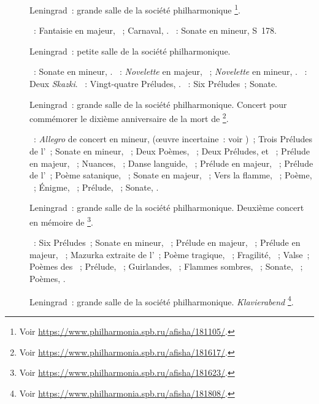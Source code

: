 \begin{description}
 \item[]
 Leningrad~: grande salle de la société philharmonique%
 \footnote{Voir \href{https://www.philharmonia.spb.ru/afisha/181105/}%
 {https://www.philharmonia.spb.ru/afisha/181105/}.}.

 \textsc{\Schumann{}}~: Fantaisie en \kC majeur, ~; Carnaval,
 .
 \textsc{\Liszt{}}~: Sonate en \kB mineur, S~178.
 \item[]
 Leningrad~: petite salle de la société philharmonique.

 \textsc{\Beethoven{}}~: Sonate en \kC \Sharp mineur,  .
 \textsc{\Schumann{}}~: \emph{Novelette} en \kE majeur, 
 ~; \emph{Novelette} en \kF \Sharp mineur,  .
 \textsc{\Medtner{}}~: Deux \emph{Skazki}.
 \textsc{\Chopin{}}~: Vingt-quatre Préludes, .
 \textsc{\Scriabine{}}~: Six Préludes~; Sonate.
 \item[]
 Leningrad~: grande salle de la société philharmonique.
 Concert pour commémorer le dixième anniversaire de la mort de \Scriabine{}%
 \footnote{Voir \href{https://www.philharmonia.spb.ru/afisha/181617/}%
 {https://www.philharmonia.spb.ru/afisha/181617/}.}.

 \textsc{\Scriabine{}}~: \emph{Allegro} de concert en \kB \Flat mineur,
  (œuvre incertaine~: voir \citet[p.~396]{Scriabine})~; Trois
 Préludes de l'~; Sonate en \kF \Sharp mineur, ~; Deux
 Poèmes, ~; Deux Préludes,   et ~;
 Prélude en \kF majeur,  ~; Nuances, 
 ~; Danse languide,  ~; Prélude en \kE majeur,
  ~; Prélude de l'~; Poème satanique,
 ~; Sonate en \kF \Sharp majeur, ~; Vers la flamme,
 ~; Poème,  ~; Énigme,  ~;
 Prélude,  ~; Sonate, .
 \item[]
 Leningrad~: grande salle de la société philharmonique.
 Deuxième concert en mémoire de \Scriabine{}%
 \footnote{Voir \href{https://www.philharmonia.spb.ru/afisha/181623/}%
 {https://www.philharmonia.spb.ru/afisha/181623/}.}.

 \textsc{\Scriabine{}}~: Six Préludes~; Sonate en \kG \Sharp mineur,
 ~; Prélude en \kB \Flat majeur,  ~; Prélude en
 \kF \Sharp majeur,  ~; Mazurka extraite de l'~;
 Poème tragique, ~; Fragilité,  ~; Valse~;
 Poèmes des ~; Prélude,  ~;
 Guirlandes,  ~; Flammes sombres,  ~;
 Sonate, ~; Poèmes, .
 \item[]
 Leningrad~: grande salle de la société philharmonique.
 \foreignlanguage{german}{\emph{Klavierabend}}%
 \footnote{Voir \href{https://www.philharmonia.spb.ru/afisha/181808/}%
 {https://www.philharmonia.spb.ru/afisha/181808/}.}.


\end{description}
